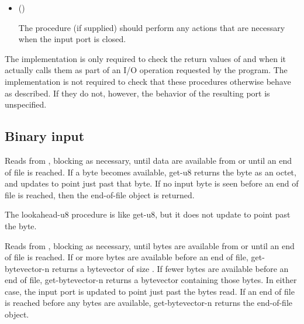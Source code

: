 \begin{entry}{%
}
\begin{itemize}
\item {\cf ()}
       
  The  procedure (if supplied) should perform any actions
  that are necessary when the input port is closed.
\end{itemize}

\implresp The implementation is only required to check the return
values of  and  when it actually calls
them as part of an I/O operation requested by the program.  The
implementation is not required to check that these procedures
otherwise behave as described.  If they do not, however, the behavior
of the resulting port is unspecified.
\end{entry}

\subsection{Binary input}

\begin{entry}{%
}
   
Reads from , blocking as necessary, until data are
available from  or until an end of file is reached.
If a byte becomes available, {\cf get-u8} returns the byte as an octet, and
updates  to point just past that byte. If no input
byte is seen before an end of file is reached, then the end-of-file
object is returned.
\end{entry}

\begin{entry}{%
}
   
The {\cf lookahead-u8} procedure is like {\cf get-u8}, but it does not 
update  to point past the byte.
\end{entry}

\begin{entry}{%
}
   
Reads from , blocking as necessary, until 
bytes are available from  or until an end of file is
reached. If  or more bytes are available before an end
of file, {\cf get-bytevector-n} returns a bytevector of size .
If fewer bytes are available before an end of file, {\cf get-bytevector-n}
returns a bytevector
containing those bytes. In either case, the input port is updated to
point just past the bytes read.  If an end of file is reached before
any bytes are available, {\cf get-bytevector-n} returns the end-of-file object.
\end{entry}

